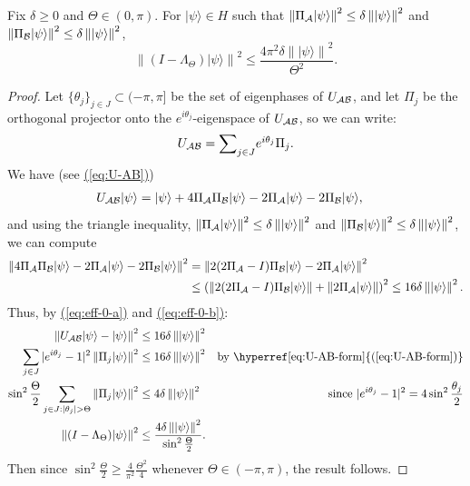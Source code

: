 \documentclass{article}
\newcommand{\eq}[1]{\hyperref[eq:#1]{(\ref*{eq:#1})}}
\def\ket#1{{\lvert}#1\rangle}
\renewcommand{\>}{\rangle}
\newcommand{\<}{\langle}
\renewcommand{\(}{\left(}
\renewcommand{\)}{\right)}
\def\norm#1{\left\| #1 \right\|}
\begin{document}
\begin{lemma}\label{lem:effectively-zero}
Fix $\delta\geq0$ and $\Theta\in (0,\pi)$. For $\ket{\psi}\in H$ such that $\norm{\Pi_{\cal A}\ket{\psi}}^2\leq \delta\norm{\ket{\psi}}^2$ and  $\norm{\Pi_{\cal B}\ket{\psi}}^2\leq \delta\norm{\ket{\psi}}^2$, 
\begin{equation*}
\norm{(I-\Lambda_\Theta)\ket{\psi}}^2  \leq \frac{4\pi^2\delta\norm{\ket{\psi}}^2}{\Theta^2}.
\end{equation*}
\end{lemma}
\begin{proof}
Let $\{\theta_j\}_{j\in J}\subset (-\pi,\pi]$ be the set of eigenphases of $U_{\cal AB}$, and let $\Pi_j$ be the orthogonal projector onto the $e^{i\theta_j}$-eigenspace of $U_{\cal AB}$, so we can write:
\begin{equation}
U_{\cal AB} = \textstyle{\displaystyle\sum}_{j\in J} e^{i\theta_j}\Pi_j.\label{eq:U-AB-form}
\end{equation}
We have (see \eq{U-AB})
\begin{align}
U_{\cal AB}\ket{\psi} &= \ket{\psi} + 4\Pi_{\cal A}\Pi_{\cal B}\ket{\psi}-2\Pi_{\cal A}\ket{\psi}-2\Pi_{\cal B}\ket{\psi},\label{eq:eff-0-a}
\end{align}
and using the triangle inequality, $\norm{\Pi_{\cal A}\ket{\psi}}^2\leq \delta\norm{\ket{\psi}}^2$ and $\norm{\Pi_{\cal B}\ket{\psi}}^2 \leq \delta\norm{\ket{\psi}}^2$, we can compute
\begin{equation}
\begin{split}
\norm{4\Pi_{\cal A}\Pi_{\cal B}\ket{\psi}-2\Pi_{\cal A}\ket{\psi}-2\Pi_{\cal B}\ket{\psi}}^2 
&= \norm{2(2\Pi_{\cal A}-I)\Pi_{\cal B}\ket{\psi}-2\Pi_{\cal A}\ket{\psi}}^2\\
&\leq \left(\norm{2(2\Pi_{\cal A}-I)\Pi_{\cal B}\ket{\psi}} + \norm{2\Pi_{\cal A}\ket{\psi}}\right)^2 
\leq 16\delta\norm{\ket{\psi}}^2.
\end{split}\label{eq:eff-0-b}
\end{equation}
Thus, by \eq{eff-0-a} and \eq{eff-0-b}:
\begin{align*}
\norm{U_{\cal AB}\ket{\psi}-\ket{\psi}}^2 &\leq 16\delta\norm{\ket{\psi}}^2\\
\sum_{j\in J}|e^{i\theta_j}-1|^2\norm{\Pi_j\ket{\psi}}^2 & \leq 16\delta\norm{\ket{\psi}}^2 & \mbox{by \eq{U-AB-form}}\\
\sin^2\frac{\Theta}{2}\sum_{j\in J:|\theta_j|>\Theta}\norm{\Pi_j\ket{\psi}}^2 & \leq 4\delta\norm{\ket{\psi}}^2 & \mbox{since }|e^{i\theta_j}-1|^2 = 4\sin^2\frac{\theta_j}{2}\\
\norm{(I-\Lambda_\Theta)\ket{\psi}}^2 & \leq \frac{4\delta\norm{\ket{\psi}}^2}{\sin^2\frac{\Theta}{2}}.
\end{align*}
Then since $\sin^2\frac{\Theta}{2}\geq \frac{4}{\pi^2}\frac{\Theta^2}{4}$ whenever $\Theta\in (-\pi,\pi)$, the result follows.
\end{proof}
\end{document}
